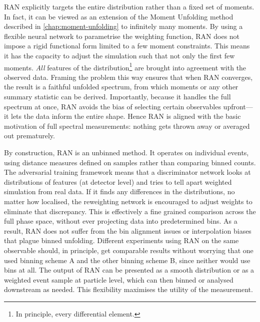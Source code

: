 {{        RAN explicitly targets the entire distribution rather than a fixed set of moments.
        In fact, it can be viewed as an extension of the Moment Unfolding method described in \cref{chap:moment-unfolding} to infinitely many moments.
        By using a flexible neural network to parametrise the weighting function, RAN does not impose a rigid functional form limited to a few moment constraints.
        This means it has the capacity to adjust the simulation such that not only the first few moments.
        \emph{All} features of the distribution\footnote{In principle, every differential element.} are brought into agreement with the observed data.
        Framing the problem this way ensures that when RAN converges, the result is a faithful unfolded spectrum, from which moments or any other summary statistic can be derived.
        Importantly, because it handles the full spectrum at once, RAN avoids the bias of selecting certain observables upfront---it lets the data inform the entire shape. 
        Hence RAN is aligned with the basic motivation of full spectral measurements: nothing gets thrown away or averaged out prematurely.

        By construction, RAN is an unbinned method.
        It operates on individual events, using distance measures defined on samples rather than comparing binned counts.
        The adversarial training framework means that a discriminator network looks at distributions of features (at detector level) and tries to tell apart weighted simulation from real data.
        If it finds any differences in the distributions, no matter how localised, the reweighting network is encouraged to adjust weights to eliminate that discrepancy.
        This is effectively a fine grained comparison across the full phase space, without ever projecting data into predetermined bins.
        As a result, RAN does not suffer from the bin alignment issues or interpolation biases that plague binned unfolding.
        Different experiments using RAN on the same observable should, in principle, get comparable results without worrying that one used binning scheme A and the other binning scheme B, since neither would use bins at all.
        The output of RAN can be presented as a smooth distribution or as a weighted event sample at particle level, which can then binned or analysed downstream as needed.
        This flexibility maximises the utility of the measurement.

}}
